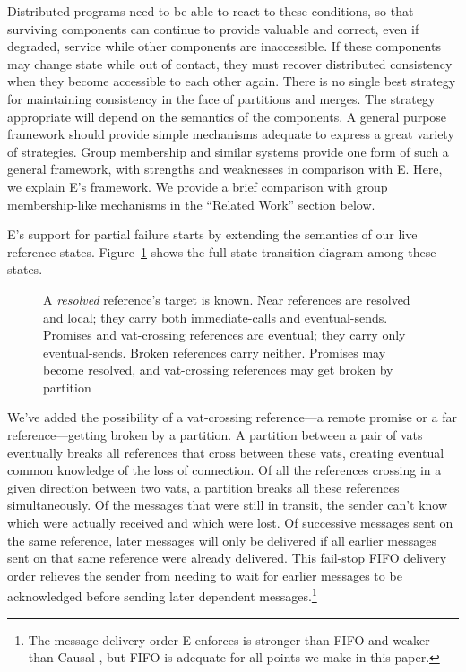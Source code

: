 \documentclass{llncs}
\begin{document}
Distributed programs need to be able to react to these conditions, so
that surviving components can continue to provide valuable and
correct, even if degraded, service while other components are
inaccessible. If these components may change state while out of
contact, they must recover distributed consistency when they become
accessible to each other again. There is no single best strategy for
maintaining consistency in the face of partitions and merges. The
strategy appropriate will depend on the semantics of the components. A
general purpose framework should provide simple mechanisms adequate to
express a great variety of strategies. Group membership and similar
systems provide one form of such a general framework, with strengths
and weaknesses in comparison with E. Here, we explain E's
framework. We provide a brief comparison with group membership-like
mechanisms in the ``Related Work'' section below.

E's support for partial failure starts by extending the semantics of
our live reference states. Figure~\ref{fig:refstates} shows the full
state transition diagram among these states.

\begin{figure}
\centerline{}
\caption{A \emph{resolved} reference's target is known. Near
  references are resolved and local; they carry both immediate-calls
  and eventual-sends. Promises and vat-crossing references are
  eventual; they carry only eventual-sends. Broken references carry
  neither. Promises may become resolved, and vat-crossing references
  may get broken by partition }
\label{fig:refstates}
\end{figure}

We've added the possibility of a vat-crossing reference---a remote
promise or a far reference---getting broken by a partition. A
partition between a pair of vats eventually breaks all references that
cross between these vats, creating eventual common knowledge of the
loss of connection. Of all the references crossing in a given
direction between two vats, a partition breaks all these references
simultaneously. Of the messages that were still in transit, the sender
can't know which were actually received and which were lost. Of
successive messages sent on the same reference, later messages will
only be delivered if all earlier messages sent on that same reference
were already delivered. This fail-stop FIFO delivery order relieves
the sender from needing to wait for earlier messages to be
acknowledged before sending later dependent messages.\footnote{
%
The message delivery order E enforces is stronger than FIFO and weaker
than Causal \cite{tribble:channels}, but FIFO is adequate for all
points we make in this paper.}
\end{document}
